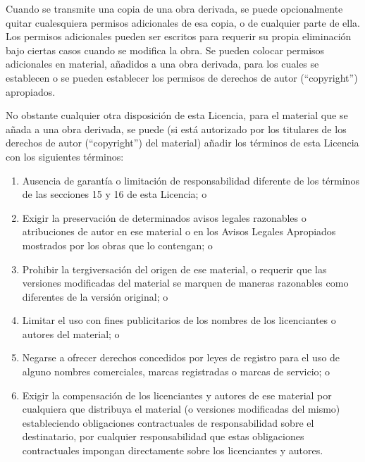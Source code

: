 \documentclass[11pt]{article}
\begin{document}
\begin{enumerate}
Cuando se transmite una copia de una obra derivada, se puede
opcionalmente quitar cualesquiera permisos adicionales de esa copia,
o de cualquier parte de ella. Los permisos adicionales pueden ser
escritos para requerir su propia eliminaci\'{o}n bajo ciertas casos cuando
se modifica la obra. Se pueden colocar permisos adicionales en material,
a\~nadidos a una obra derivada, para los cuales se establecen o se 
pueden establecer los permisos de derechos de autor (``copyright'') apropiados.

No obstante cualquier otra disposici\'{o}n de esta Licencia, para el
material que se a\~nada a una obra derivada, se puede (si est\'{a} autorizado
por los titulares de los derechos de autor (``copyright'') del material) a\~nadir los t\'{e}rminos de esta 
Licencia con los siguientes t\'{e}rminos:
  \begin{enumerate}
  \item Ausencia de garant\'{i}a o limitaci\'{o}n de responsabilidad diferente de 
    los t\'{e}rminos de las secciones 15 y 16 de esta Licencia; o

  \item Exigir la preservaci\'{o}n de determinados avisos legales razonables o
     atribuciones de autor en ese material o en los Avisos Legales 
     Apropiados mostrados por los obras que lo contengan; o

  \item Prohibir la tergiversaci\'{o}n del origen de ese material, o requerir 
    que las versiones modificadas del material se marquen de maneras 
    razonables como diferentes de la versi\'{o}n original; o

  \item Limitar el uso con fines publicitarios de los nombres de los 
    licenciantes o autores del material; o

  \item Negarse a ofrecer derechos concedidos por leyes de registro para el
    uso de alguno nombres comerciales, marcas registradas o marcas de servicio; o

  \item Exigir la compensaci\'{o}n de los licenciantes y autores de ese material por 
    cualquiera que distribuya el material (o versiones modificadas del mismo) 
    estableciendo obligaciones contractuales de responsabilidad sobre el 
    destinatario, por cualquier responsabilidad que estas obligaciones 
    contractuales impongan directamente sobre los licenciantes y autores.
  \end{enumerate}


\end{enumerate}
\end{document}

